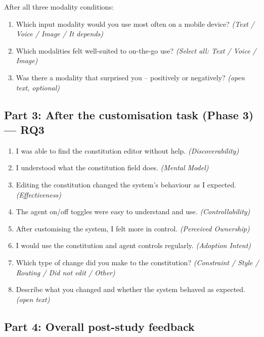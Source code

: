 \documentclass[sigconf, anonymous]{acmart}
\begin{document}
After all three modality conditions:
\begin{enumerate}
  \item[10.] Which input modality would you use most often on a mobile device? \emph{(Text / Voice / Image / It depends)}
  \item[11.] Which modalities felt well-suited to on-the-go use? \emph{(Select all: Text / Voice / Image)}
  \item[--] Was there a modality that surprised you -- positively or negatively? \emph{(open text, optional)}
\end{enumerate}

\subsection*{Part 3: After the customisation task (Phase 3) --- RQ3}

\begin{enumerate}
  \item I was able to find the constitution editor without help. \emph{(Discoverability)}
  \item I understood what the constitution field does. \emph{(Mental Model)}
  \item Editing the constitution changed the system's behaviour as I expected. \emph{(Effectiveness)}
  \item The agent on/off toggles were easy to understand and use. \emph{(Controllability)}
  \item After customising the system, I felt more in control. \emph{(Perceived Ownership)}
  \item I would use the constitution and agent controls regularly. \emph{(Adoption Intent)}
  \item[7.] Which type of change did you make to the constitution? \emph{(Constraint / Style / Routing / Did not edit / Other)}
  \item[--] Describe what you changed and whether the system behaved as expected. \emph{(open text)}
\end{enumerate}

\subsection*{Part 4: Overall post-study feedback}
\end{document}
